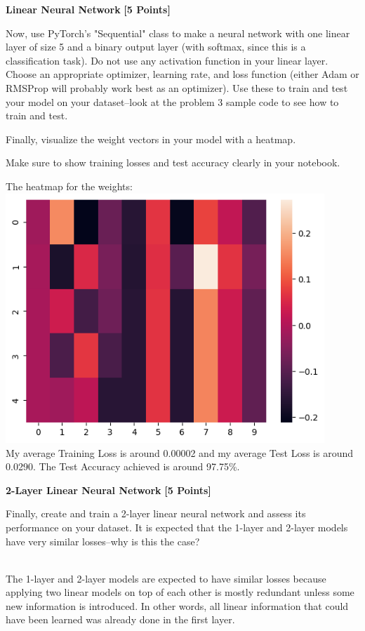 \problem \textbf{Linear Neural Network} \textbf{[5 Points]}

Now, use PyTorch's "Sequential" class to make a neural network with one linear layer of size 5 and a binary output layer (with softmax, since this is a classification task). Do not use any activation function in your linear layer. Choose an appropriate optimizer, learning rate, and loss function (either Adam or RMSProp will probably work best as an optimizer). Use these to train and test your model on your dataset--look at the problem 3 sample code to see how to train and test.

Finally, visualize the weight vectors in your model with a heatmap.

Make sure to show training losses and test accuracy clearly in your notebook.

\begin{solution}
  The heatmap for the weights:
  \\
  \includegraphics[width=12cm]{images/P2_C.png} \\
  My average Training Loss is around 0.00002 and my average Test Loss is around 0.0290. The Test Accuracy achieved is around 97.75\%.
\end{solution}


\problem \textbf{2-Layer Linear Neural Network} \textbf{[5 Points]}

Finally, create and train a 2-layer linear neural network and assess its performance on your dataset. It is expected that the 1-layer and 2-layer models have very similar losses--why is this the case?

\begin{solution}
  \\
  The 1-layer and 2-layer models are expected to have similar losses because applying two linear models on top of each other is mostly redundant unless some new information is introduced. In other words, all linear information that could have been learned was already done in the first layer.
\end{solution}

